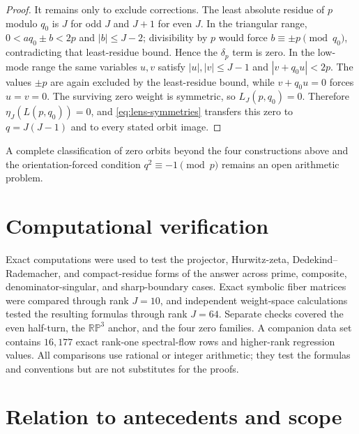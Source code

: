 \documentclass[11pt]{article}
\theoremstyle{definition}
\begin{document}
\begin{proof}
It remains only to exclude corrections.  The least absolute residue of $p$
modulo $q_0$ is $J$ for odd $J$ and $J+1$ for even $J$.  In the triangular
range, $0<aq_0\pm b<2p$ and $|b|\leq J-2$; divisibility by $p$ would force
$b\equiv\pm p\pmod{q_0}$, contradicting that least-residue bound.  Hence the
$\delta_p$ term is zero.  In the low-mode range the same variables $u,v$
satisfy $|u|,|v|\leq J-1$ and $|v+q_0u|<2p$.  The values $\pm p$ are again
excluded by the least-residue bound, while $v+q_0u=0$ forces $u=v=0$.
The surviving zero weight is symmetric, so $L_J(p,q_0)=0$.  Therefore
$\eta_J(L(p,q_0))=0$, and \eqref{eq:lens-symmetries} transfers this zero to
$q=J(J-1)$ and to every stated orbit image.
\end{proof}

A complete classification of zero orbits beyond the four constructions
above and the orientation-forced condition $q^2\equiv-1\pmod p$ remains
an open arithmetic problem.

\section{Computational verification}
\label{sec:computational-verification}

Exact computations were used to test the projector, Hurwitz-zeta,
Dedekind--Rademacher, and compact-residue forms of the answer across prime,
composite, denominator-singular, and sharp-boundary cases.  Exact symbolic
fiber matrices were compared through rank $J=10$, and independent
weight-space calculations tested the resulting formulas through rank $J=64$.
Separate checks covered the even half-turn, the $\mathbb{RP}^3$ anchor, and
the four zero families.  A companion data set contains $16{,}177$ exact
rank-one spectral-flow rows and higher-rank regression values.  All
comparisons use rational or integer arithmetic; they test the formulas and
conventions but are not substitutes for the proofs.

\FloatBarrier

\section{Relation to antecedents and scope}
\label{sec:scope}
\end{document}
